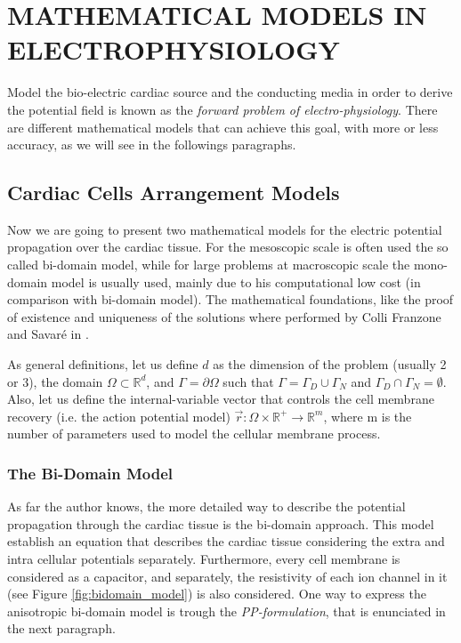\section{MATHEMATICAL MODELS IN ELECTROPHYSIOLOGY}

Model the bio-electric cardiac source and the conducting media in order to derive the potential field is known as the \textsl{forward problem of electro-physiology}. There are different mathematical models that can achieve this goal, with more or less accuracy, as we will see in the followings paragraphs. 

\subsection{Cardiac Cells Arrangement Models}

Now we are going to present two mathematical models for the electric potential propagation over the cardiac tissue. For the mesoscopic scale is often used the so called bi-domain model, while for large problems at macroscopic scale the mono-domain model is usually used, mainly due to his computational low cost (in comparison with bi-domain model). The mathematical foundations, like the proof of existence and uniqueness of the solutions where performed by Colli Franzone and Savaré in \cite{colli_franzone}.

As general definitions, let us define $d$ as the dimension of the problem (usually 2 or 3), the domain $\Omega \subset \mathbb{R}^d$, and $\Gamma = \partial \Omega$ such that $\Gamma = \Gamma_D \cup \Gamma_N$ and $\Gamma_D \cap \Gamma_N = \emptyset$. Also, let us define the internal-variable vector that controls the cell membrane recovery (i.e. the action potential model) $\vec{r}: \Omega \times \mathbb{R}^+ \rightarrow \mathbb{R}^m$, where m is the number of parameters used to model the cellular membrane process.

\subsubsection{The Bi-Domain Model}

As far the author knows, the more detailed way to describe the potential propagation through the cardiac tissue is the bi-domain approach. This model establish an equation that describes the cardiac tissue considering the extra and intra cellular potentials separately. Furthermore, every cell membrane is considered as a capacitor, and separately, the resistivity of each ion channel in it (see Figure \ref{fig:bidomain_model}) is also considered. One way to express the anisotropic bi-domain model is trough the \textsl{PP-formulation}, that is enunciated in the next paragraph.

